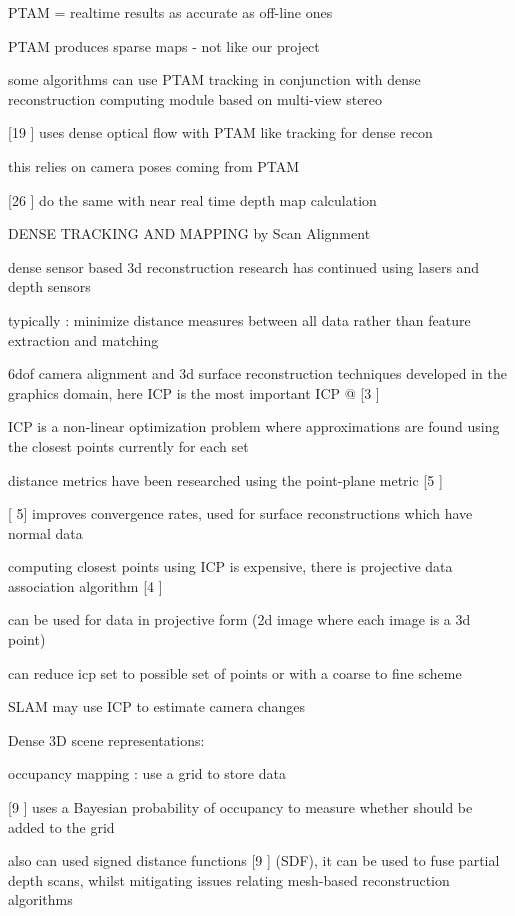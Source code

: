 PTAM = realtime results as accurate as off-line ones

PTAM produces sparse maps - not like our project

some algorithms can use PTAM tracking in conjunction with dense reconstruction computing module based on multi-view stereo

[19 \cite{Newcombe10Live}] uses dense optical flow with PTAM like tracking for dense recon

this relies on camera poses coming from PTAM

[26 \cite{Stuhmer10Real}] do the same with near real time depth map calculation

DENSE TRACKING AND MAPPING by Scan Alignment

dense sensor based 3d reconstruction research has continued using lasers and depth sensors

typically : minimize distance measures between all data rather than feature extraction and matching

6dof camera alignment and 3d surface reconstruction techniques developed in the graphics domain, here ICP is the most important
ICP @ [3 \cite{Besl92Method} ]

ICP is a non-linear optimization problem where approximations are found using the closest points currently for each
set

distance metrics have been researched using the point-plane metric [5 \cite{Chen92Object}]

[\cite{Chen92Object} 5] improves convergence rates, used for surface reconstructions which have normal data

computing closest points using ICP is expensive, there is projective data association algorithm [4 \cite{Blais95Registering}]

can be used for data in projective form (2d image where each image is a 3d point)

can reduce icp set to possible set of points or with a coarse to fine scheme

SLAM may use ICP to estimate camera changes

Dense 3D scene representations:

occupancy mapping : use a grid to store data

[9 \cite{Elfes87Sensor}] uses a Bayesian probability of occupancy to measure whether should be added to the grid

also can used signed distance functions [9 \cite{Elfes87Sensor}] (SDF), it can be used to fuse partial depth scans, whilst mitigating
issues relating mesh-based reconstruction algorithms


